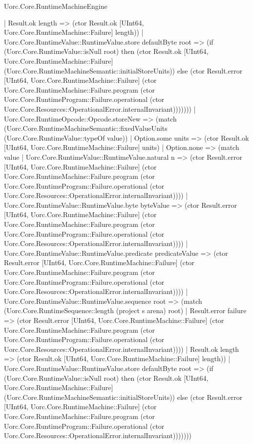 \begin{lexlean}{Uorc.Core.RuntimeMachineEngine}
\begin{semanticmodule}
{                | Result.ok length => (ctor Result.ok [UInt64, Uorc.Core.RuntimeMachine::Failure] length))
              | Uorc.Core.RuntimeValue::RuntimeValue.store defaultByte root => (if (Uorc.Core.RuntimeValue::isNull root) then (ctor Result.ok [UInt64, Uorc.Core.RuntimeMachine::Failure] (Uorc.Core.RuntimeMachineSemantic::initialStoreUnits)) else (ctor Result.error [UInt64, Uorc.Core.RuntimeMachine::Failure] (ctor Uorc.Core.RuntimeMachine::Failure.program (ctor Uorc.Core.RuntimeProgram::Failure.operational (ctor Uorc.Core.Resources::OperationalError.internalInvariant)))))))
          | Uorc.Core.RuntimeOpcode::Opcode.storeNew => (match (Uorc.Core.RuntimeMachineSemantic::fixedValueUnits (Uorc.Core.RuntimeValue::typeOf value))
            | Option.some units => (ctor Result.ok [UInt64, Uorc.Core.RuntimeMachine::Failure] units)
            | Option.none => (match value
              | Uorc.Core.RuntimeValue::RuntimeValue.natural n => (ctor Result.error [UInt64, Uorc.Core.RuntimeMachine::Failure] (ctor Uorc.Core.RuntimeMachine::Failure.program (ctor Uorc.Core.RuntimeProgram::Failure.operational (ctor Uorc.Core.Resources::OperationalError.internalInvariant))))
              | Uorc.Core.RuntimeValue::RuntimeValue.byte byteValue => (ctor Result.error [UInt64, Uorc.Core.RuntimeMachine::Failure] (ctor Uorc.Core.RuntimeMachine::Failure.program (ctor Uorc.Core.RuntimeProgram::Failure.operational (ctor Uorc.Core.Resources::OperationalError.internalInvariant))))
              | Uorc.Core.RuntimeValue::RuntimeValue.predicate predicateValue => (ctor Result.error [UInt64, Uorc.Core.RuntimeMachine::Failure] (ctor Uorc.Core.RuntimeMachine::Failure.program (ctor Uorc.Core.RuntimeProgram::Failure.operational (ctor Uorc.Core.Resources::OperationalError.internalInvariant))))
              | Uorc.Core.RuntimeValue::RuntimeValue.sequence root => (match (Uorc.Core.RuntimeSequence::length (project s arena) root)
                | Result.error failure => (ctor Result.error [UInt64, Uorc.Core.RuntimeMachine::Failure] (ctor Uorc.Core.RuntimeMachine::Failure.program (ctor Uorc.Core.RuntimeProgram::Failure.operational (ctor Uorc.Core.Resources::OperationalError.internalInvariant))))
                | Result.ok length => (ctor Result.ok [UInt64, Uorc.Core.RuntimeMachine::Failure] length))
              | Uorc.Core.RuntimeValue::RuntimeValue.store defaultByte root => (if (Uorc.Core.RuntimeValue::isNull root) then (ctor Result.ok [UInt64, Uorc.Core.RuntimeMachine::Failure] (Uorc.Core.RuntimeMachineSemantic::initialStoreUnits)) else (ctor Result.error [UInt64, Uorc.Core.RuntimeMachine::Failure] (ctor Uorc.Core.RuntimeMachine::Failure.program (ctor Uorc.Core.RuntimeProgram::Failure.operational (ctor Uorc.Core.Resources::OperationalError.internalInvariant)))))))
}
\end{semanticmodule}
\end{lexlean}
